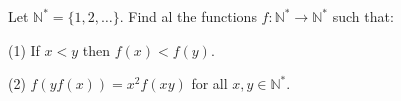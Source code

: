 Let $\mathbb{N}^*=\{1,2,\ldots\}$. Find al the functions $f: \mathbb{N}^*\rightarrow \mathbb{N}^*$ such that:

(1) If $x<y$ then $f(x)<f(y)$.

(2) $f\left(yf(x)\right)=x^2f(xy)$ for all $x,y \in\mathbb{N}^*$.